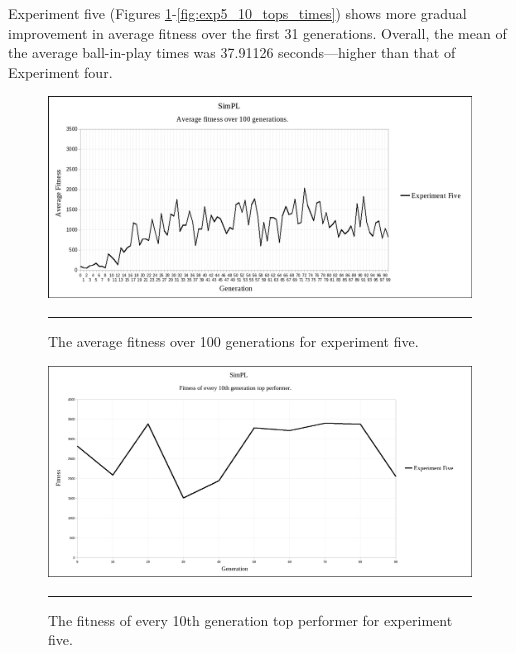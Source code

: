 Experiment five (Figures \ref{fig:exp5_avg_fit}-\ref{fig:exp5_10_tops_times}) shows more gradual improvement in average fitness over the first 31 generations. Overall, the mean of the average ball-in-play times was 37.91126 seconds---higher than that of Experiment four.

\begin{figure}[ht!]  
  \centering
  \includegraphics[width=5in]{../Figures/Chapter3/exp5_avg_fit.png}
  \rule{35em}{0.5pt}
  \caption[Experiment Five Average Fitness]{The average fitness over 100 generations for experiment five.}
  \label{fig:exp5_avg_fit}
\end{figure}

\begin{figure}[ht!]  
  \centering
  \includegraphics[width=5in]{../Figures/Chapter3/exp5_10_tops.png}
  \rule{35em}{0.5pt}
  \caption[Experiment Five Top Performers]{The fitness of every 10th generation top performer for experiment five.}
  \label{fig:exp5_10_tops}
\end{figure}

